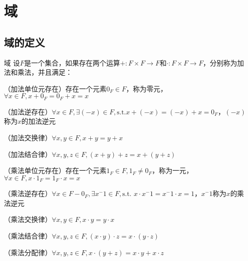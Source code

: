 \documentclass[12pt, a4paper, oneside, UTF8]{ctexbook}
\begin{document}
% 
\else
\fi
\chapter{域}
	\section{域的定义}
		\begin{defn}{域}{}
			设$F$是一个集合，如果存在两个运算$+:F \times F \rightarrow F$和$\cdot :F \times F \rightarrow F$，分别称为加法和乘法，并且满足：
			
			（加法单位元存在）存在一个元素$0_F \in F$，称为零元，$\forall x \in F,x+0_F=0_F+x=x$
			
			（加法逆存在）$ \forall x \in F,\exists (-x) \in F,\text{s.t.}x+(-x)=(-x)+x=0_F$，$(-x)$称为$x$的加法逆元
			
			（加法交换律）$\forall x,y \in F,x+y = y+x$
			
			（加法结合律）$\forall x,y,z \in F,(x+y)+z = x+(y+z)$
			
			（乘法单位元存在）存在一个元素$1_F \in F,1_F \neq 0_F$，称为一元，$\forall x \in F,x\cdot 1_F=1_F \cdot x = x$
			
			（乘法逆存在）$\forall x \in F-{0_F},\exists x^-1 \in F,\text{s.t. }x\cdot x^-1=x^-1 \cdot x = 1$，$x^-1$称为$x$的乘法逆元
			
			（乘法交换律）$\forall x,y \in F,x\cdot y = y\cdot x$
			
			（乘法结合律）$\forall x,y,z \in F,(x\cdot y)\cdot z = x\cdot (y\cdot z)$
			
			（乘法分配律）$\forall x,y,z \in F,x\cdot(y+z)=x\cdot y+x\cdot z$
		\end{defn}
\ifx\allfiles\undefined
\end{document}
